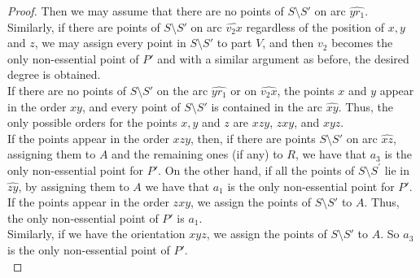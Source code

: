 \documentclass[11pt,a4paper]{article}
\theoremstyle{plain}
\theoremstyle{definition}
\begin{document}
\begin{proof}
Then we may assume that there are no points of  $S\setminus S'$ on arc $\widehat{yr_1}$. Similarly, if there are points of  $S\setminus S'$ on arc $\widehat{v_2x}$ regardless of the position of $x,y$ and $z$, we may assign every point in $S\setminus S'$ to part $V$, and then $v_2$ becomes the only non-essential point of $P'$ and with a similar argument as before, the desired degree is obtained.\\ 
If there are no points of $S\setminus S'$ on the arc $\widehat{yr_1}$ or on $\widehat{v_2x}$, the points $x$ and $y$ appear in the order $xy$, and every point of $S\setminus S'$ is contained in the arc $\widehat{xy}$. Thus, the only possible orders for the points $x,y$ and $z$ are $xzy$, $zxy$, and $xyz$.\\
If the points appear in the order $xzy$, then, if there are points $S\setminus S'$ on arc $\widehat{xz}$, assigning them to $A$ and the remaining ones (if any) to $R$, we have that $a_3$ is the only non-essential point for $P'$. On the other hand, if all the points of $S\setminus S^\prime$ lie in $\widehat{zy}$, by assigning them to $A$ we have that $a_1$ is the only non-essential point for $P'$. \\ 
If the points appear in the order $zxy$, we assign the points of $S\setminus S'$ to $A$. Thus, the only non-essential point of $P'$ is $a_1$.\\
Similarly, if we have the orientation $xyz$, we assign the points of $S\setminus S'$ to $A$. So $a_3$ is the only non-essential point of $P'$.\\


\end{proof}
\end{document}

